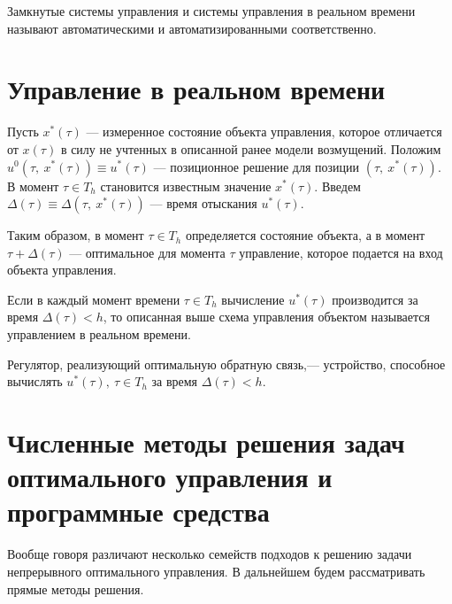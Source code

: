 Замкнутые системы управления и системы управления в реальном времени называют автоматическими и автоматизированными соответственно.


\section{Управление в реальном времени}\label{1_3}


Пусть $x^*(\tau)$ --- измеренное состояние объекта управления, которое отличается от $x(\tau)$ в силу не учтенных в описанной ранее модели возмущений. Положим $u^0(\tau, ~x^*(\tau)) \equiv u^*(\tau)$ --- позиционное решение для позиции $(\tau, ~x^*(\tau))$. В момент $\tau \in T_h$ становится известным значение $x^*(\tau)$. Введем $\Delta(\tau) \equiv \Delta(\tau, ~x^*(\tau))$ --- время отыскания $u^*(\tau)$.


Таким образом, в момент $\tau \in T_h$ определяется состояние объекта, а в момент $\tau + \Delta(\tau)$ --- оптимальное для момента $\tau$ управление, которое подается на вход объекта управления.


\begin{definition}  Если в каждый момент времени $\tau \in T_h$ вычисление $u^*(\tau)$ производится за время $\Delta(\tau) < h$, то описанная выше схема управления объектом называется управлением в реальном времени. 
\end{definition}


\begin{definition}   Регулятор, реализующий оптимальную обратную связь,--- устройство, способное вычислять $u^*(\tau),	 ~\tau \in T_h$ за время $\Delta(\tau) < h$.
\end{definition}


\section{Численные методы решения задач оптимального управления и программные средства}\label{1_4}


Вообще говоря различают несколько семейств подходов к решению задачи непрерывного оптимального управления. В дальнейшем будем рассматривать прямые методы решения. 


